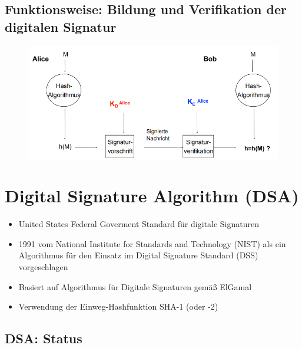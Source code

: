 \documentclass[openany]{book}
\begin{document}
\newpage

\subsection{Funktionsweise: Bildung und Verifikation der digitalen Signatur}

\begin{figure}[h!]
    \centering
    \includegraphics[width=0.85\linewidth]{Pics/Signature.PNG}
\end{figure} 

\section{Digital Signature Algorithm (DSA)}

\begin{itemize}
    \item United States Federal Goverment Standard für digitale Signaturen
    \item 1991 vom National Institute for Standards and Technology (NIST) als ein Algorithmus für den Einsatz im Digital Signature Standard (DSS) vorgeschlagen
    \item Basiert auf Algorithmus für Digitale Signaturen gemäß ElGamal
    \item Verwendung der Einweg-Hashfunktion SHA-1 (oder -2)
\end{itemize}

\subsection{DSA: Status}
\end{document}
